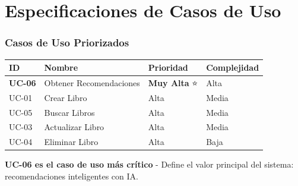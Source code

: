 \documentclass[aspectratio=169]{beamer}
\begin{document}
\section{Especificaciones de Casos de Uso}

\begin{frame}
\frametitle{Casos de Uso Priorizados}

\begin{table}
\centering
\small
\begin{tabular}{p{1.5cm}p{4.5cm}p{2cm}p{2cm}}
\toprule
\textbf{ID} & \textbf{Nombre} & \textbf{Prioridad} & \textbf{Complejidad} \\
\midrule
\textbf{UC-06} & Obtener Recomendaciones & \textbf{Muy Alta} ⭐ & Alta \\
UC-01 & Crear Libro & Alta & Media \\
UC-05 & Buscar Libros & Alta & Media \\
UC-03 & Actualizar Libro & Alta & Media \\
UC-04 & Eliminar Libro & Alta & Baja \\
\bottomrule
\end{tabular}
\end{table}

\vspace{0.3cm}

\begin{tcolorbox}[colback=red!5, colframe=red!50]
\textbf{UC-06 es el caso de uso más crítico} - Define el valor principal del sistema: recomendaciones inteligentes con IA.
\end{tcolorbox}

\end{frame}
\end{document}
